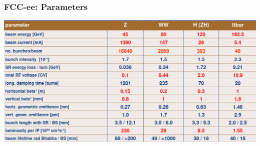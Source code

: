 \documentclass[aspectratio=169]{beamer}
\begin{document}
\begin{frame}
    \frametitle{FCC-ee: Parameters}
    \includegraphics[width=1.0\linewidth]{figures/parameters-fccee.png}
\end{frame}
\end{document}

